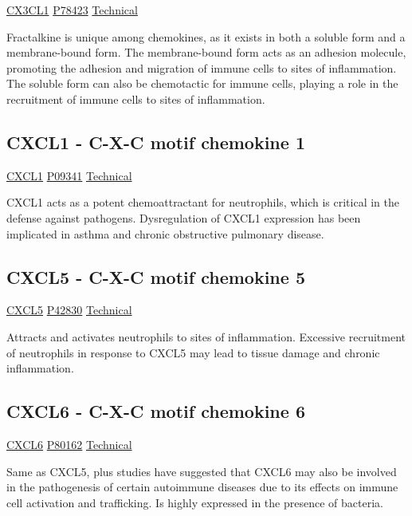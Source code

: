 \href{https://en.wikipedia.org/wiki/CX3CL1}{CX3CL1}
\href{http://www.uniprot.org/uniprot/P78423}{P78423}
\href{https://olink.com/products-services/target/protein/?assayID=5120}{Technical}

Fractalkine is unique among chemokines, as it exists in both a soluble form and a membrane-bound form. The membrane-bound form acts as an adhesion molecule, promoting the adhesion and migration of immune cells to sites of inflammation. The soluble form can also be chemotactic for immune cells, playing a role in the recruitment of immune cells to sites of inflammation.

\subsection{CXCL1 - C-X-C motif chemokine 1}

\href{https://en.wikipedia.org/wiki/CXCL1}{CXCL1}
\href{http://www.uniprot.org/uniprot/P09341}{P09341}
\href{https://olink.com/products-services/target/protein/?assayID=5074}{Technical}

CXCL1 acts as a potent chemoattractant for neutrophils, which is critical in the defense against pathogens. Dysregulation of CXCL1 expression has been implicated in asthma and chronic obstructive pulmonary disease.

\subsection{CXCL5 - C-X-C motif chemokine 5}

\href{https://en.wikipedia.org/wiki/CXCL5}{CXCL5}
\href{http://www.uniprot.org/uniprot/P42830}{P42830}
\href{https://olink.com/products-services/target/protein/?assayID=5059}{Technical}

Attracts and activates neutrophils to sites of inflammation. Excessive recruitment of neutrophils in response to CXCL5 may lead to tissue damage and chronic inflammation.

\subsection{CXCL6 - C-X-C motif chemokine 6}

\href{https://en.wikipedia.org/wiki/CXCL6}{CXCL6}
\href{http://www.uniprot.org/uniprot/P80162}{P80162}
\href{https://olink.com/products-services/target/protein/?assayID=5094}{Technical}

Same as CXCL5, plus studies have suggested that CXCL6 may also be involved in the pathogenesis of certain autoimmune diseases due to its effects on immune cell activation and trafficking. Is highly expressed in the presence of bacteria.

